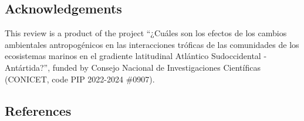 \documentclass[
]{article}
\begin{document}
\subsection{Acknowledgements}\label{acknowledgements}

This review is a product of the project ``¿Cuáles son los efectos de los
cambios ambientales antropogénicos en las interacciones tróficas de las
comunidades de los ecosistemas marinos en el gradiente latitudinal
Atlántico Sudoccidental - Antártida?'', funded by Consejo Nacional de
Investigaciones Científicas (CONICET, code PIP 2022-2024 \#0907).

\subsection*{References}\label{references}
\end{document}
